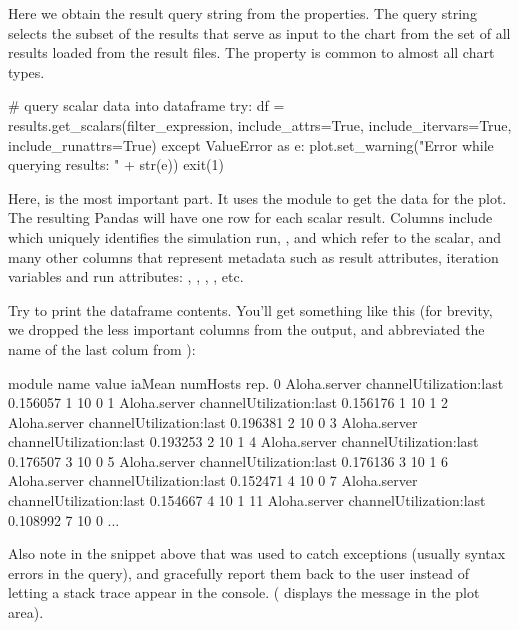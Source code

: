 Here we obtain the result query string from the properties. The query string
selects the subset of the results that serve as input to the chart from the set of
all results loaded from the result files. The  property is
common to almost all chart types.

\begin{python}
# query scalar data into dataframe
try:
    df = results.get_scalars(filter_expression, include_attrs=True,
                         include_itervars=True, include_runattrs=True)
except ValueError as e:
    plot.set_warning("Error while querying results: " + str(e))
    exit(1)
\end{python}

Here,  is the most important part. It uses the
 module to get the data for the plot. The resulting Pandas
 will have one row for each scalar result. Columns include
 which uniquely identifies the simulation run, ,
 and  which refer to the scalar, and many other columns
that represent metadata such as result attributes, iteration variables and run
attributes: , , , , etc.

Try  to print the dataframe contents. You'll get something like
this (for brevity, we dropped the less important columns from the output, and
abbreviated the name of the last colum from ):

\begin{commandline}
          module                     name     value iaMean numHosts rep.
0   Aloha.server  channelUtilization:last  0.156057      1       10    0
1   Aloha.server  channelUtilization:last  0.156176      1       10    1
2   Aloha.server  channelUtilization:last  0.196381      2       10    0
3   Aloha.server  channelUtilization:last  0.193253      2       10    1
4   Aloha.server  channelUtilization:last  0.176507      3       10    0
5   Aloha.server  channelUtilization:last  0.176136      3       10    1
6   Aloha.server  channelUtilization:last  0.152471      4       10    0
7   Aloha.server  channelUtilization:last  0.154667      4       10    1
11  Aloha.server  channelUtilization:last  0.108992      7       10    0
...
\end{commandline}

Also note in the snippet above that  was used to catch
exceptions (usually syntax errors in the query), and gracefully report them back
to the user instead of letting a stack trace appear in the console.
( displays the message in the plot area).


